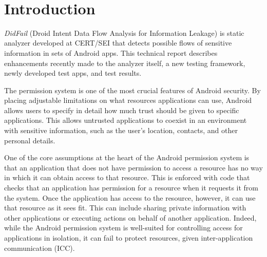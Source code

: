 \makeatletter
\patchcmd{\chapter}{\if@openright\cleardoublepage\else\clearpage\fi}{\vspace{1in}}{}{}
\makeatother

\nonfrenchspacing


{} \\
\chapter{Introduction}
\label{sec:intro}
\textit{DidFail} (Droid Intent Data Flow Analysis for Information Leakage) is
static analyzer developed at CERT/SEI that detects possible flows of sensitive
information in sets of Android apps. 
This technical report describes enhancements recently made to the analyzer
itself, a new testing framework, newly developed test apps, and test results. 

The permission system is one of the most crucial features of Android security. By placing adjustable limitations on what resources applications can use, Android allows users to specify in detail how much trust should be given to specific applications. This allows untrusted applications to coexist in an environment with sensitive information, such as the user's location, contacts, and other personal details. 

One of the core assumptions at the heart of the Android permission system is that an application that does not have permission to access a resource has no way in which it can obtain access to that resource. This is enforced with code that checks that an application has permission for a resource when it requests it from the system. Once the application has access to the resource, however, it can use that resource as it sees fit. This can include sharing private information with other applications or executing actions on behalf of another application. Indeed, while the Android permission system is well-suited for controlling access for applications in isolation, it can fail to protect resources, given inter-application communication (ICC).

